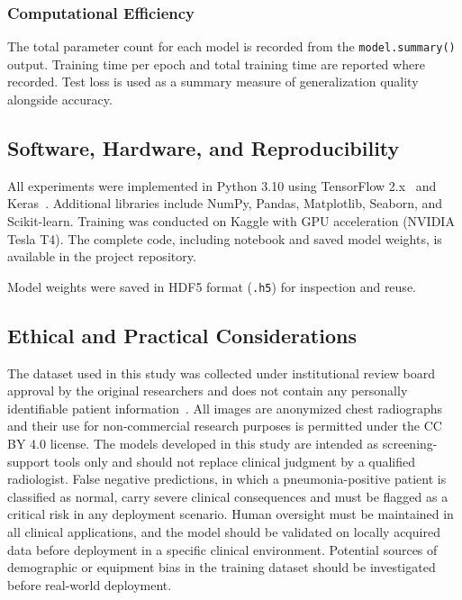 \documentclass[preprint,12pt]{elsarticle}
\begin{document}
\subsubsection{Computational Efficiency}
The total parameter count for each model is recorded from the
\texttt{model.summary()} output.
Training time per epoch and total training time are reported where
recorded.
Test loss is used as a summary measure of generalization quality
alongside accuracy.

\subsection{Software, Hardware, and Reproducibility}
All experiments were implemented in Python 3.10 using TensorFlow 2.x~\cite{tensorflow}
and Keras~\cite{keras}.
Additional libraries include NumPy, Pandas, Matplotlib, Seaborn,
and Scikit-learn.
Training was conducted on Kaggle with GPU acceleration (NVIDIA Tesla T4).
The complete code, including notebook and saved model weights, is
available in the project repository.

Model weights were saved in HDF5 format (\texttt{.h5}) for inspection
and reuse.

\subsection{Ethical and Practical Considerations}
The dataset used in this study was collected under institutional
review board approval by the original researchers and does not contain
any personally identifiable patient information~\cite{kermany2018}.
All images are anonymized chest radiographs and their use for
non-commercial research purposes is permitted under the CC BY 4.0
license.
The models developed in this study are intended as screening-support
tools only and should not replace clinical judgment by a qualified
radiologist.
False negative predictions, in which a pneumonia-positive patient is
classified as normal, carry severe clinical consequences and must be
flagged as a critical risk in any deployment scenario.
Human oversight must be maintained in all clinical applications, and
the model should be validated on locally acquired data before
deployment in a specific clinical environment.
Potential sources of demographic or equipment bias in the training
dataset should be investigated before real-world deployment.
\end{document}
